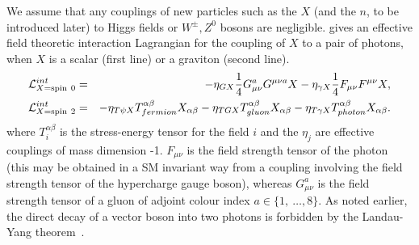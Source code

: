 We assume that any couplings of new particles such as the $X$ (and the $n$, to
be introduced later) to Higgs
fields or $W^\pm, Z^0$ bosons are negligible. 
 gives an effective field theoretic interaction
Lagrangian for the 
coupling of $X$ to a pair of photons, when $X$ is a scalar (first line) or  a
graviton (second line). 
 \begin{eqnarray}
	\mathcal{L}_{X={\rm spin~0}}^{int} &=&    - \eta_{GX}\frac{1}{4} G_{\mu \nu}^a
                                   G^{\mu \nu a} X  - \eta_{\gamma X} \frac{1}{4}
                                   F_{\mu \nu} F^{\mu \nu} X, \nonumber\\
	\mathcal{L}_{X={\rm spin~2}}^{int} &=&    -\eta_{T\psi X}T_{fermion}^{\alpha\beta}
                                   X_{\alpha\beta}-\eta_{TGX} T_{gluon}^{\alpha\beta}
                                   X_{\alpha\beta}  - \eta_{T\gamma X} 
T_{photon}^{\alpha\beta} X_{\alpha\beta}.
	\label{eq:Lagrangian1}
\end{eqnarray}
where  $T^{\alpha\beta}_i$ is the stress-energy tensor for the  field $i$
and the $\eta_j$ are effective couplings of mass dimension -1.
$F_{\mu \nu}$ is the field strength tensor of the photon (this may be obtained
in a SM invariant way from a coupling involving the field strength tensor of
the hypercharge gauge boson),
whereas $G_{\mu 
  \nu}^a$ is the field strength tensor of a gluon of adjoint colour index $a
\in \{ 1,\ \ldots , 8 \}$.
As noted earlier, the direct decay of a vector boson into two photons is
forbidden by the 
Landau-Yang theorem~\cite{Landau:1948kw,Yang:1950rg}. 

